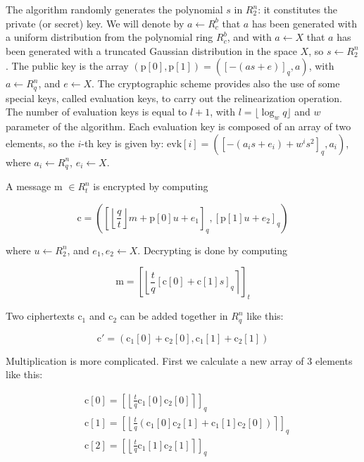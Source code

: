 The algorithm randomly generates the polynomial $s$ in $R^n_2$: it constitutes the private (or secret) key. We will denote by $a \leftarrow R^b_c$ that $a$ has been generated with a uniform distribution from the polynomial ring $R^b_c$, and with $a \leftarrow X$ that $a$ has been generated with a truncated Gaussian distribution in the space $X$, so $s \leftarrow R^n_2$. The public key is the array $(\text{p}[0], \text{p}[1]) = ([-(as + e)]_q, a)$, with $a \leftarrow R^n_q$, and $e \leftarrow X$. The cryptographic scheme provides also the use of some special keys, called evaluation keys, to carry out the relinearization operation. The number of evaluation keys is equal to $l + 1$, with $l=\lfloor \log_w q \rfloor$ and $w$ parameter of the algorithm. Each evaluation key is composed of an array of two elements, so the $i$-th key is given by: $\text{evk}[i] = ([-(a_is+e_i)+w^is^2]_q, a_i)$, where $a_i \leftarrow R^n_q$, $e_i \leftarrow X$.

A message m $\in R^n_t$ is encrypted by computing

\begin{equation*}
    \text{c} = \left(\left[\left \lfloor \frac{q}{t} \right \rfloor m + \text{p}[0] u + e_1 \right]_q , [\text{p}[1] u + e_2 ]_q\right) 
\end{equation*}

\noindent where $u \leftarrow R^n_2$, and $e_1, e_2 \leftarrow X$. Decrypting is done by computing

\begin{equation*}
    \text{m} = \left[\left\lfloor  \frac{t}{q}  [\text{c}[0] + \text{c}[1] s]_q  \right\rceil\right]_t
\end{equation*}

Two ciphertexts $\text{c}_1$ and $\text{c}_2$ can be added together in $R^n_q$ like this:

\begin{equation*}
    \text{c}'=(\text{c}_1[0] + \text{c}_2[0], \text{c}_1[1] + \text{c}_2[1])
\end{equation*}

Multiplication is more complicated. First we calculate a new array of 3 elements like this:

\begin{align*}
    &\text{c}[0] = \left[\left\lfloor\frac{t}{q}\text{c}_1[0]\text{c}_2[0]\right\rceil\right]_q\\
    &\text{c}[1] = \left[\left\lfloor\frac{t}{q}(\text{c}_1[0]\text{c}_2[1]+\text{c}_1[1]\text{c}_2[0])\right\rceil\right]_q\\
    &\text{c}[2] = \left[\left\lfloor\frac{t}{q}\text{c}_1[1]\text{c}_2[1]\right\rceil\right]_q
\end{align*}

